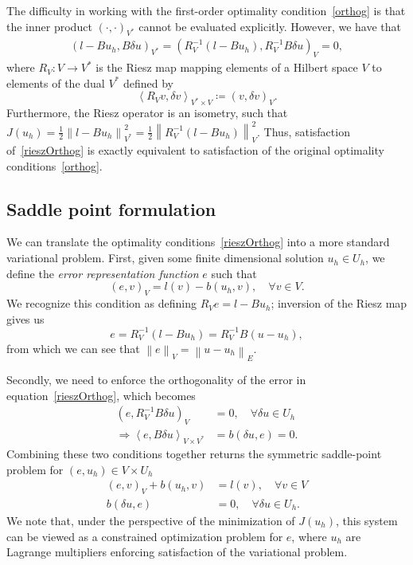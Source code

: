 \documentclass[final,leqno]{siamltex}
\newcommand{\nor}[1]{\left\| #1 \right\|}
\newcommand{\LRp}[1]{\left( #1 \right)}
\newcommand{\LRa}[1]{\left\langle #1 \right\rangle}
\begin{document}
The difficulty in working with the first-order optimality condition~\eqref{orthog} is that the inner product $\LRp{\cdot,\cdot}_{V^*}$ cannot be evaluated explicitly.  However, we have that 
\begin{align}
\left(l-Bu_h,B\delta u\right)_{V^*} = \left(R_V^{-1}(l-Bu_h),R_V^{-1}B\delta u\right)_{V} = 0,
\label{rieszOrthog}
\end{align}
where $R_V: V\rightarrow V^*$ is the Riesz map mapping elements of a Hilbert space $V$ to elements of the dual $V^*$ defined by
\[
\LRa{R_Vv,\delta v}_{V^*\times V} \coloneqq \LRp{v,\delta v}_V.
\]
Furthermore, the Riesz operator is an isometry, such that $J(u_h) = \frac{1}{2}\nor{l-Bu_h}^2_{V^*} = \frac{1}{2}\nor{R_V^{-1}(l-Bu_h)}^2_{V}$.  Thus, satisfaction of~\eqref{rieszOrthog} is exactly equivalent to satisfaction of the original optimality conditions~\eqref{orthog}.  

\subsection{Saddle point formulation}
\label{sec:saddlePoint}
We can translate the optimality conditions~\eqref{rieszOrthog} into a more standard variational problem.  First, given some finite dimensional solution $u_h\in U_h$, we define the \textit{error representation function} $e$ such that
\[
\LRp{e,v}_V = l(v)-b(u_h,v), \quad \forall v\in V.
\]
We recognize this condition as defining $R_V e = l-Bu_h$; inversion of the Riesz map gives us 
\[
e = R_V^{-1}\LRp{l-Bu_h} = R_V^{-1}B\LRp{u-u_h},
\]
from which we can see that $\nor{e}_V = \nor{u-u_h}_E$.  

Secondly, we need to enforce the orthogonality of the error in equation~\eqref{rieszOrthog}, which becomes
\begin{align*}
\LRp{e,R_V^{-1}B\delta u}_V &= 0, \quad \forall \delta u \in U_h\\
\Rightarrow \LRa{e,B\delta u}_{V\times V^*} &= b(\delta u, e) = 0.
\end{align*}
Combining these two conditions together returns the symmetric saddle-point problem for $\LRp{e,u_h} \in V\times U_h$
\begin{align*}
\LRp{e,v}_V + b(u_h,v) &= l(v), \quad \forall v\in V\\
b(\delta u, e) &= 0, \quad \forall \delta u \in U_h.
\end{align*}
We note that, under the perspective of the minimization of $J(u_h)$, this system can be viewed as a constrained optimization problem for $e$, where $u_h$ are Lagrange multipliers enforcing satisfaction of the variational problem.  
\end{document}
